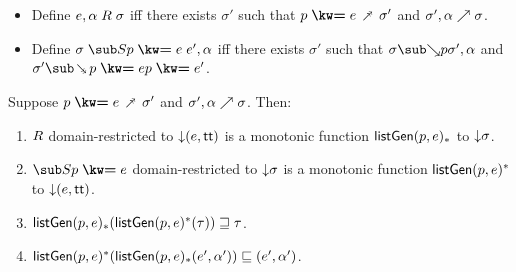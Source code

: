 \begin{lemma}
  \label{lem:aux:list-gen:gc}
  \item
  \begin{itemize}
    \item Define $e, \alpha \mathrel{R} \sigma $ iff there exists $\sigma'$ such that $\clauseUncurried{p}{e} \desugarClauseFwd \sigma'$ and ${\sigma'},{\alpha} \nearrow {\sigma}$.
    \item Define $\sigma \listGenBwd{\clauseUncurried{p}{e}} e', \alpha$ iff there exists $\sigma'$ such that $\totalisebwd{\sigma}{p}{\sigma'}{\alpha}$ and $\sigma' \desugarClauseBwd{\clauseUncurried{p}{e}} \clauseUncurried{p}{e'}$.
  \end{itemize}
  Suppose $\clauseUncurried{p}{e} \desugarClauseFwd \sigma'$ and ${\sigma'},{\alpha} \nearrow {\sigma}$. Then:
  \begin{enumerate}
     \item $\mathrel{R}$ domain-restricted to ${\downarrow}{(e, \mathsf{tt})}$ is a monotonic function $\mathsf{listGen}(p, e)_*$ to ${\downarrow}{\sigma}$.
     \item $\listGenBwd{\clauseUncurried{p}{e}}$ domain-restricted to ${\downarrow}{\sigma}$ is a monotonic function $\mathsf{listGen}(p, e)^*$ to ${\downarrow}{(e, \mathsf{tt})}$.
     \item $\mathsf{listGen}(p, e)_*(\mathsf{listGen}(p, e)^*(\tau)) \sqsupseteq \tau$.
     \item $\mathsf{listGen}(p, e)^*(\mathsf{listGen}(p, e)_*(e', \alpha')) \sqsubseteq (e', \alpha')$.
  \end{enumerate}
\end{lemma}
